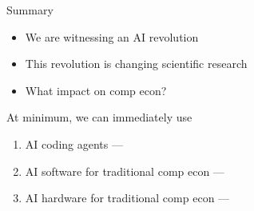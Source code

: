\begin{frame}{Summary}

    \begin{itemize}
        \item We are witnessing an AI revolution
        \medskip
        \item This revolution is changing scientific research
        \medskip
        \item What impact on comp econ?
    \end{itemize}

        \medskip
        \medskip

    At minimum, we can immediately use
    \begin{enumerate}
        \item AI coding agents --- 
        \medskip
        \item AI software for traditional comp econ --- 
        \medskip
        \item AI hardware for traditional comp econ --- 
    \end{enumerate}


\end{frame}





